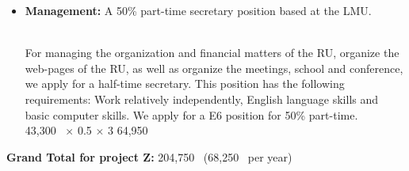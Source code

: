 \documentclass[10pt,fleqn,twoside]{article}
\begin{document}
\begin{itemize}
For regular expenses of the management (printing costs, postal services, toner,
copying materials, etc..) we request 1000~\EUR{} per year.
\vspace{0.2em}\\
1000~\EUR{} $\times$ 3              \hfill 3,000~\EUR{}\\
\item 
\begin{Emphasize}
{\bf Management:} A 50\% part-time secretary position based at the LMU.
\end{Emphasize}\\
For managing the organization and financial matters of the RU, 
organize the web-pages of the RU, as
well as organize the meetings, school and conference, we apply for
a half-time secretary. This position has the following requirements:
Work relatively independently, English language skills and 
basic computer skills. We apply for a E6 position for 50\% part-time.
\vspace{0.2em}\\
43,300~\EUR{} $\times$ 0.5 $\times$ 3              \hfill 64,950~\EUR{}\\
\end{itemize}

\begin{Emphasize}
{\bf Grand Total for project Z:}  \hfill 204,750~\EUR{} (68,250~\EUR{}
per year)\\
\end{Emphasize}\\
 
\end{document}
